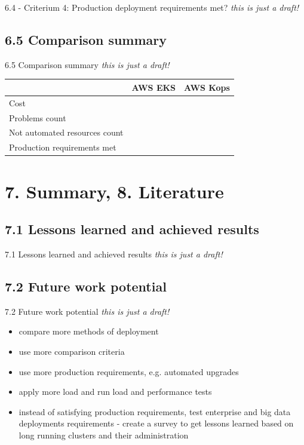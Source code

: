 \documentclass{beamer}
\begin{document}
\begin{frame}{6.4 - Criterium 4: Production deployment requirements met?}%
\textit{this is just a draft!}

\end{frame}

\subsection{6.5 Comparison summary}
\begin{frame}{6.5 Comparison summary}%
	\textit{this is just a draft!}
	\begin{tabular}{| l | c | c |}
		\hline
		& AWS EKS & AWS Kops \\
		\hline
		Cost &  &  \\
		\hline
		Problems count &  &  \\
		\hline
		Not automated resources count &  &  \\
		\hline
		Production requirements met &  &  \\
		\hline
		\end{tabular}
\end{frame}

\section{7. Summary, 8. Literature}
\subsection{7.1 Lessons learned and achieved results}
\begin{frame}{7.1 Lessons learned and achieved results}%
	\textit{this is just a draft!}
\end{frame}
\subsection{7.2 Future work potential}
\begin{frame}{7.2 Future work potential}%
	\textit{this is just a draft!}
\begin{itemize}
	\item compare more methods of deployment
	\item use more comparison criteria 
	\item use more production requirements, e.g. automated upgrades
	\item apply more load and run load and performance tests
	\item instead of satisfying production requirements, test enterprise and big data deployments requirements - create a survey to get lessons learned based on long running clusters and their administration
\end{itemize}
\end{frame}
\end{document}
